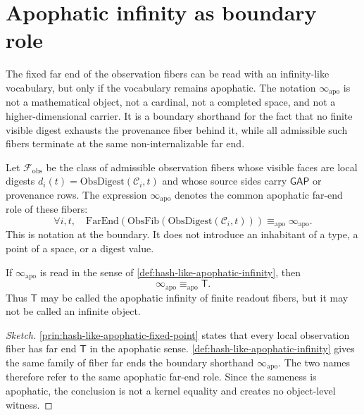 \section{Apophatic infinity as boundary role}
\label{sec:hash-like-apophatic-infinity}

The fixed far end of the observation fibers can be read with an infinity-like vocabulary, but only if the vocabulary remains apophatic. The notation $\infty_{\mathrm{apo}}$ is not a mathematical object, not a cardinal, not a completed space, and not a higher-dimensional carrier. It is a boundary shorthand for the fact that no finite visible digest exhausts the provenance fiber behind it, while all admissible such fibers terminate at the same non-internalizable far end.

\begin{definition}
\label{def:hash-like-apophatic-infinity}
Let $\mathcal{F}_{\mathrm{obs}}$ be the class of admissible observation fibers whose visible faces are local digests $d_i(t)=\mathrm{ObsDigest}(\mathcal{C}_i,t)$ and whose source sides carry $\mathsf{GAP}$ or provenance rows. The expression $\infty_{\mathrm{apo}}$ denotes the common apophatic far-end role of these fibers:
$$
\forall i,t,\quad
\mathrm{FarEnd}(\mathrm{ObsFib}(\mathrm{ObsDigest}(\mathcal{C}_i,t)))
\equiv_{\mathrm{apo}} \infty_{\mathrm{apo}}.
$$
This is notation at the boundary. It does not introduce an inhabitant of a type, a point of a space, or a digest value.
\end{definition}

\begin{theorem}
\label{thm:hash-like-apophatic-infinity-is-T}
If $\infty_{\mathrm{apo}}$ is read in the sense of \autoref{def:hash-like-apophatic-infinity}, then
$$
\infty_{\mathrm{apo}} \equiv_{\mathrm{apo}} \mathsf{T}.
$$
Thus $\mathsf{T}$ may be called the apophatic infinity of finite readout fibers, but it may not be called an infinite object.
\end{theorem}

\begin{proof}[Sketch]
\autoref{prin:hash-like-apophatic-fixed-point} states that every local observation fiber has far end $\mathsf{T}$ in the apophatic sense. \autoref{def:hash-like-apophatic-infinity} gives the same family of fiber far ends the boundary shorthand $\infty_{\mathrm{apo}}$. The two names therefore refer to the same apophatic far-end role. Since the sameness is apophatic, the conclusion is not a kernel equality and creates no object-level witness.
\end{proof}

